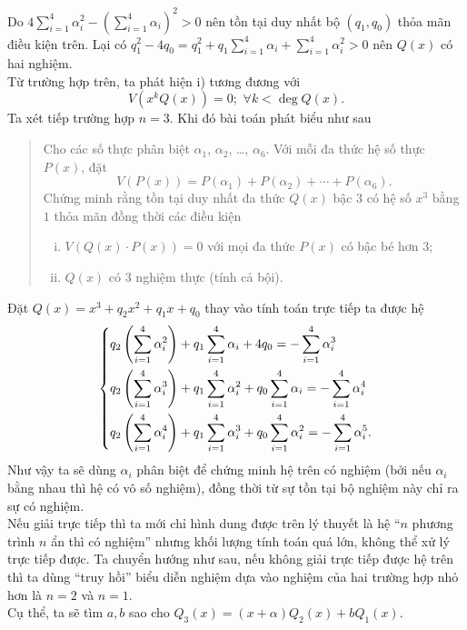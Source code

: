 \begin{bt}
{		Do $4\displaystyle\sum_{i=1}^4\alpha_i^2-\left(\displaystyle\sum_{i=1}^4\alpha_i\right)^2>0$ nên tồn tại duy nhất bộ $(q_1,q_0)$ thỏa mãn điều kiện trên. Lại có $q_1^2-4q_0=q_1^2+q_1\displaystyle\sum_{i=1}^4\alpha_i+\displaystyle\sum_{i=1}^4\alpha_i^2>0$ nên $Q(x)$ có hai nghiệm.\\
		Từ trường hợp trên, ta phát hiện i) tương đương với
		$$V\left(x^kQ(x)\right)=0;\,\,\forall k<\deg Q(x).$$
		Ta xét tiếp trường hợp $n=3$. Khi đó bài toán phát biểu như sau
		\begin{quote}
			Cho các số thực phân biệt $\alpha_1$, $\alpha_2$, \ldots, $\alpha_{6}$. Với mỗi đa thức hệ số thực $P(x)$, đặt
			$$V(P(x))=P(\alpha_1)+P(\alpha_2)+\cdots+P(\alpha_{6}).$$
			Chứng minh rằng tồn tại duy nhất đa thức $Q(x)$ bậc $3$ có hệ số $x^3$ bằng $1$ thỏa mãn đồng thời các điều kiện
			\begin{enumerate}[i)]
				\item $V\left(Q(x)\cdot P(x)\right)=0$ với mọi đa thức $P(x)$ có bậc bé hơn $3$;
				\item $Q(x)$ có $3$ nghiệm thực (tính cả bội).
			\end{enumerate}
		\end{quote}
		Đặt $Q(x)=x^3+q_2x^2+q_1x+q_0$ thay vào tính toán trực tiếp ta được hệ
		$$\left\{\begin{aligned}& q_2\left(\displaystyle\sum_{i=1}^4\alpha_i^2\right)+q_1\displaystyle\sum_{i=1}^4\alpha_i+4q_0=-\displaystyle\sum_{i=1}^4\alpha_i^3\\
			& q_2\left(\displaystyle\sum_{i=1}^4\alpha_i^3\right)+q_1\displaystyle\sum_{i=1}^4\alpha_i^2+q_0\displaystyle\sum_{i=1}^4\alpha_i=-\displaystyle\sum_{i=1}^4\alpha_i^4\\
			& q_2\left(\displaystyle\sum_{i=1}^4\alpha_i^4\right)+q_1\displaystyle\sum_{i=1}^4\alpha_i^3+q_0\displaystyle\sum_{i=1}^4\alpha_i^2=-\displaystyle\sum_{i=1}^4\alpha_i^5.\end{aligned}\right.$$
		Như vậy ta sẽ dùng $\alpha_i$ phân biệt để chứng minh hệ trên có nghiệm (bởi nếu $\alpha_i$ bằng nhau thì hệ có vô số nghiệm), đồng thời từ sự tồn tại bộ nghiệm này chỉ ra sự có nghiệm.\\ %
		Nếu giải trực tiếp thì ta mới chỉ hình dung được trên lý thuyết là hệ ``$n$ phương trình $n$ ẩn thì có nghiệm'' nhưng khối lượng tính toán quá lớn, không thể xử lý trực tiếp được. Ta chuyển hướng như sau, nếu không giải trực tiếp được hệ trên thì ta dùng ``truy hồi'' biểu diễn nghiệm dựa vào nghiệm của hai trường hợp nhỏ hơn là $n=2$ và $n=1$.\\
		Cụ thể, ta sẽ tìm $a,b$ sao cho $Q_3(x)=(x+\alpha)Q_2(x)+bQ_1(x)$. \\
}
\end{bt}
